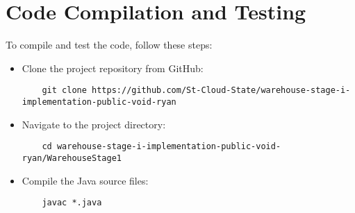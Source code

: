 \documentclass[11pt]{article}
\begin{document}
\section*{Code Compilation and Testing}
To compile and test the code, follow these steps:
\begin{itemize}[label=--]
    \item Clone the project repository from GitHub:
          \begin{verbatim}
    git clone https://github.com/St-Cloud-State/warehouse-stage-i-implementation-public-void-ryan 
    \end{verbatim}
    \item Navigate to the project directory:
          \begin{verbatim}
    cd warehouse-stage-i-implementation-public-void-ryan/WarehouseStage1
    \end{verbatim}
    \item Compile the Java source files:
          \begin{verbatim}
    javac *.java
    \end{verbatim}
\end{itemize}
\end{document}
